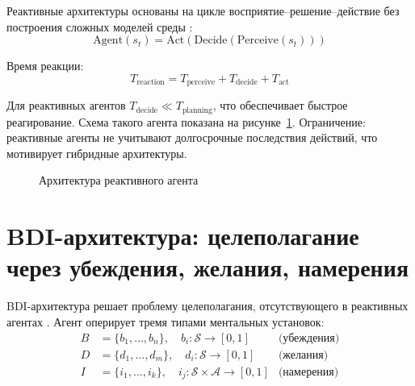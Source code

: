 Реактивные архитектуры основаны на цикле восприятие--решение--действие без построения сложных моделей среды \cite{agent_architectures}:
\begin{equation}
\text{Agent}(s_t) = \text{Act}(\text{Decide}(\text{Perceive}(s_t)))
\label{eq:reactive_agent}
\end{equation}

Время реакции:
\begin{equation}
T_{\text{reaction}} = T_{\text{perceive}} + T_{\text{decide}} + T_{\text{act}}
\label{eq:reaction_time}
\end{equation}

Для реактивных агентов $T_{\text{decide}} \ll T_{\text{planning}}$, что обеспечивает быстрое реагирование. Схема такого агента показана на рисунке~\ref{fig:reactive_agent}. Ограничение: реактивные агенты не учитывают долгосрочные последствия действий, что мотивирует гибридные архитектуры.

\begin{figure}[H]
\centering
{}
\caption{Архитектура реактивного агента \cite{wooldridge_agents,russell_artificial_intelligence}}
\label{fig:reactive_agent}
\end{figure}

\section{BDI-архитектура: целеполагание через убеждения, желания, намерения}

BDI-архитектура решает проблему целеполагания, отсутствующего в реактивных агентах \cite{bdi_architecture}. Агент оперирует тремя типами ментальных установок:
\begin{align}
B &= \{b_1, \ldots, b_n\}, \quad b_i: \mathcal{S} \to [0, 1] & \text{(убеждения)} \label{eq:beliefs} \\
D &= \{d_1, \ldots, d_m\}, \quad d_i: \mathcal{S} \to [0, 1] & \text{(желания)} \label{eq:desires} \\
I &= \{i_1, \ldots, i_k\}, \quad i_j: \mathcal{S} \times \mathcal{A} \to [0, 1] & \text{(намерения)} \label{eq:intentions}
\end{align}

